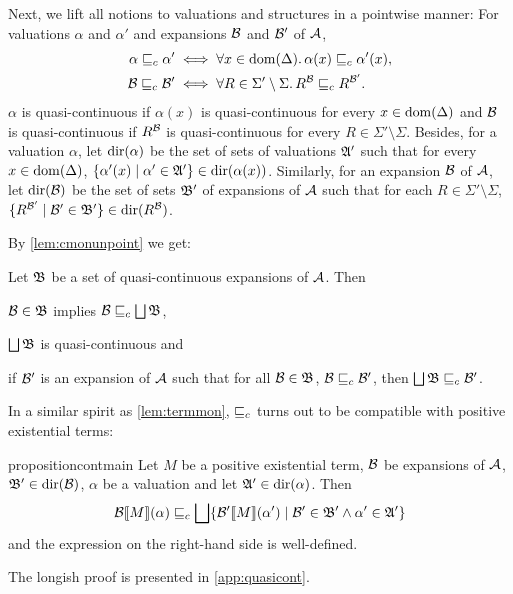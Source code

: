 \documentclass[a4paper,twoside,notitlepage,openright,11pt]{report}
\begin{document}
Next, we lift all notions to valuations and structures in a pointwise manner: For valuations $\alpha$ and $\alpha'$ and expansions $\mathcal B$ and $\mathcal B'$ of $\mathcal A$,
\begin{align*}
  \alpha\sqsubseteq_c\alpha'&\iff\forall x\in\operatorname{dom}(\Delta)\ldotp\alpha(x)\sqsubseteq_c\alpha'(x),\\
  \mathcal B\sqsubseteq_c\mathcal B'&\iff\forall R\in\Sigma'\setminus\Sigma\ldotp R^\mathcal B\sqsubseteq_c R^{\mathcal B'}.
\end{align*}
$\alpha$ is quasi-continuous if $\alpha(x)$ is quasi-continuous for every $x\in\operatorname{dom}(\Delta)$ and $\mathcal B$ is quasi-continuous if $R^\mathcal B$ is quasi-continuous for every $R\in\Sigma'\setminus\Sigma$.
Besides, for a valuation $\alpha$, let $\operatorname{dir}(\alpha)$ be the set of sets of valuations $\mathfrak A'$ such that for every $x\in\operatorname{dom}(\Delta)$, $\{\alpha'(x)\mid\alpha'\in\mathfrak A'\}\in\operatorname{dir}(\alpha(x))$. Similarly, for an expansion $\mathcal B$ of $\mathcal A$, let $\operatorname{dir}(\mathcal B)$ be the set of sets $\mathfrak B'$ of expansions of $\mathcal A$ such that for each $R\in\Sigma'\setminus\Sigma$, $\{R^{\mathcal B'}\mid\mathcal B'\in\mathfrak B'\}\in\operatorname{dir}(R^\mathcal B)$.

By \cref{lem:cmonunpoint} we get:
\begin{corollary}
  Let $\mathfrak B$ be a set of quasi-continuous expansions of $\mathcal A$. Then
  \begin{thmlist}
  \item \label{cor:unioncont} $\mathcal B\in\mathfrak B$ implies $\mathcal B\sqsubseteq_c\bigsqcup\mathfrak B$,
  \item \label{cor:uncont} $\bigsqcup\mathfrak B$ is quasi-continuous and
  \item \label{cor:unionlubprec}if $\mathcal B'$ is an expansion of $\mathcal A$ such that for all $\mathcal B\in\mathfrak B$, $\mathcal B\sqsubseteq_c\mathcal B'$, then $\bigsqcup\mathfrak B\sqsubseteq_c\mathcal B'$.
  \end{thmlist}
\end{corollary}

In a similar spirit as \cref{lem:termmon}, $\sqsubseteq_c$ turns out to be compatible with positive existential terms:
\begin{restatable}{proposition}{contmain}
  \label{lem:contmain}
  Let $M$ be a positive existential term, $\mathcal B$ be expansions of $\mathcal A$, $\mathfrak B'\in\operatorname{dir}(\mathcal B)$, $\alpha$ be a valuation and let $\mathfrak A'\in\operatorname{dir}(\alpha)$.
  Then
  \begin{align}
    \label{eq:contmain}
    {\mathcal B}\llbracket M\rrbracket(\alpha)\sqsubseteq_c\bigsqcup\{{\mathcal B'}\llbracket M\rrbracket(\alpha')\mid\mathcal B'\in\mathfrak B'\land\alpha'\in\mathfrak A'\}
  \end{align}
  and the expression on the right-hand side is well-defined.
\end{restatable}
The longish proof is presented in \cref{app:quasicont}.
\end{document}
